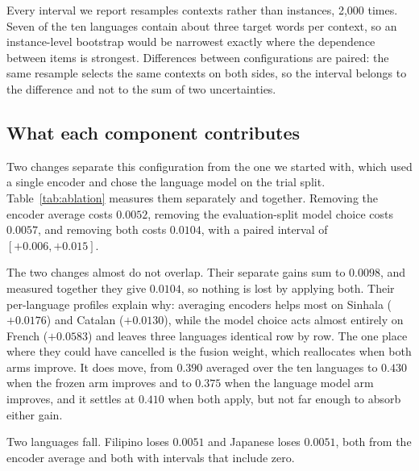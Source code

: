 Every interval we report resamples contexts rather than instances,
2{,}000 times. Seven of the ten languages contain about three target
words per context, so an instance-level bootstrap would be narrowest
exactly where the dependence between items is strongest. Differences
between configurations are paired: the same resample selects the same
contexts on both sides, so the interval belongs to the difference and
not to the sum of two uncertainties.

\subsection{What each component contributes}
\label{sec:ablation}

Two changes separate this configuration from the one we started with,
which used a single encoder and chose the language model on the trial
split. Table~\ref{tab:ablation} measures them separately and together.
Removing the encoder average costs $0.0052$, removing the
evaluation-split model choice costs $0.0057$, and removing both costs
$0.0104$, with a paired interval of $[+0.006, +0.015]$.

The two changes almost do not overlap. Their separate gains sum to
$0.0098$, and measured together they give $0.0104$, so nothing is lost
by applying both. Their per-language profiles explain why: averaging
encoders helps most on Sinhala ($+0.0176$) and Catalan ($+0.0130$),
while the model choice acts almost entirely on French ($+0.0583$) and
leaves three languages identical row by row. The one place where they
could have cancelled is the fusion weight, which reallocates when both
arms improve. It does move, from $0.390$ averaged over the ten
languages to $0.430$ when the frozen arm improves and to $0.375$ when
the language model arm improves, and it settles at $0.410$ when both
apply, but not far enough to absorb either gain.

Two languages fall. Filipino loses $0.0051$ and Japanese loses
$0.0051$, both from the encoder average and both with intervals that
include zero.

